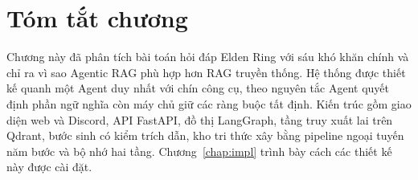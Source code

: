\section{Tóm tắt chương}
\label{sec:ch2_summary}

Chương này đã phân tích bài toán hỏi đáp Elden Ring với sáu khó khăn chính và chỉ ra vì sao Agentic RAG phù hợp hơn RAG truyền thống. Hệ thống được thiết kế quanh một Agent duy nhất với chín công cụ, theo nguyên tắc Agent quyết định phần ngữ nghĩa còn máy chủ giữ các ràng buộc tất định. Kiến trúc gồm giao diện web và Discord, API FastAPI, đồ thị LangGraph, tầng truy xuất lai trên Qdrant, bước sinh có kiểm trích dẫn, kho tri thức xây bằng pipeline ngoại tuyến năm bước và bộ nhớ hai tầng. Chương~\ref{chap:impl} trình bày cách các thiết kế này được cài đặt.
